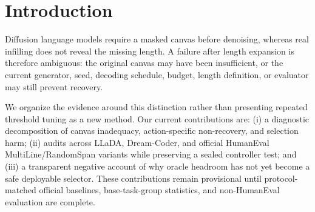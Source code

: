 \section{Introduction}
Diffusion language models require a masked canvas before denoising, whereas real infilling does not reveal the missing length. A failure after length expansion is therefore ambiguous: the original canvas may have been insufficient, or the current generator, seed, decoding schedule, budget, length definition, or evaluator may still prevent recovery.

We organize the evidence around this distinction rather than presenting repeated threshold tuning as a new method. Our current contributions are: (i) a diagnostic decomposition of canvas inadequacy, action-specific non-recovery, and selection harm; (ii) audits across LLaDA, Dream-Coder, and official HumanEval MultiLine/RandomSpan variants while preserving a sealed controller test; and (iii) a transparent negative account of why oracle headroom has not yet become a safe deployable selector. These contributions remain provisional until protocol-matched official baselines, base-task-group statistics, and non-HumanEval evaluation are complete.
